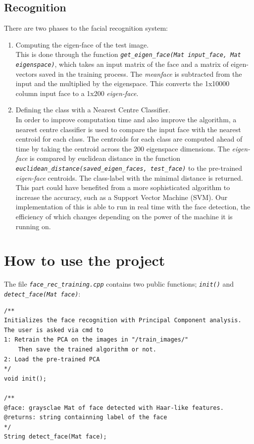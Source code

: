 \documentclass[a4paper]{article}
\begin{document}
\subsection{Recognition}
There are two phases to the facial recognition system: 
\begin{enumerate}
\item Computing the eigen-face of the test image.
\\
This is done through the function \texttt{\textit{get\_eigen\_face(Mat input\_face, Mat eigenspace)}}, which takes an input matrix of the face and a matrix of eigen-vectors saved in the training process. The \textit{meanface} is subtracted from the input and the multiplied by the eigenspace. This converts the 1x10000 column input face to a 1x200 \textit{eigen-face}.

\item Defining the class with a Nearest Centre Classifier.
\\
In order to improve computation time and also improve the algorithm, a nearest centre classifier is used to compare the input face with the nearest centroid for each class. The centroids for each class are computed ahead of time by taking the centroid across the 200 eigenspace dimensions. 
The \textit{eigen-face} is compared by euclidean distance in the function \texttt{\textit{euclidean\_distance(saved\_eigen\_faces, test\_face)}} to the pre-trained \textit{eigen-face} centroids. The class-label with the minimal distance is returned. This part could have benefited from a more sophisticated algorithm to increase the accuracy, such as a Support Vector Machine (SVM). Our implementation of this is able to run in real time with the face detection, the efficiency of which changes depending on the power of the machine it is running on.
\end{enumerate}


\section{How to use the project}
The file  \texttt{\textit{face\_rec\_training.cpp}} contains two public functions; \texttt{\textit{init()}} and \texttt{\textit{detect\_face(Mat face)}}:
\begin{lstlisting}
/**
Initializes the face recognition with Principal Component analysis. 
The user is asked via cmd to 
1: Retrain the PCA on the images in "/train_images/"
    Then save the trained algorithm or not.
2: Load the pre-trained PCA
*/
void init();

/**
@face: graysclae Mat of face detected with Haar-like features. 
@returns: string containning label of the face
*/
String detect_face(Mat face);
\end{lstlisting}
\end{document}
